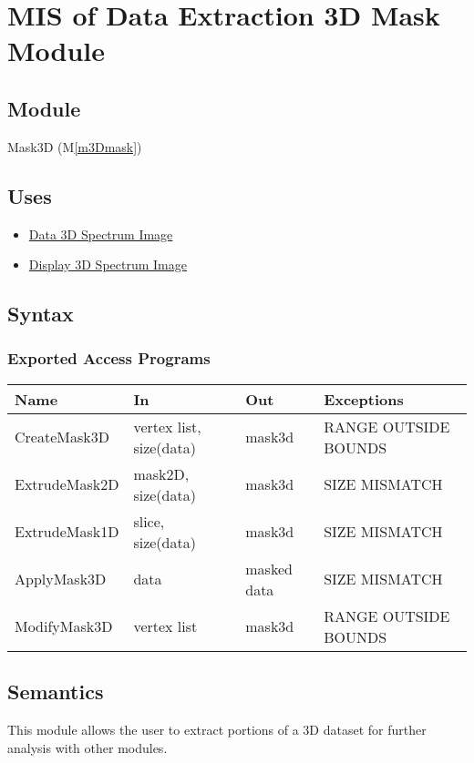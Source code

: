 \documentclass[12pt, titlepage]{article}
\newcommand{\mref}[1]{M\ref{#1}}
\begin{document}
\section{MIS of Data Extraction 3D Mask Module} \label{Mod:Mask3D}

\subsection{Module}

Mask3D (\mref{m3Dmask})

\subsection{Uses}
\begin{itemize}
    \item \hyperref[Mod:SI]{Data 3D Spectrum Image}
    \item \hyperref[Mod:Disp3D]{Display 3D Spectrum Image}
\end{itemize}

\subsection{Syntax}

\subsubsection{Exported Access Programs}

\begin{center}
    \begin{tabular}{p{3cm} p{4cm} p{4cm} p{4cm}}
        \hline
        \textbf{Name} & \textbf{In} & \textbf{Out} & \textbf{Exceptions} \\
        \hline
        CreateMask3D & vertex list, size(data) & mask3d & RANGE OUTSIDE BOUNDS \\
        ExtrudeMask2D & mask2D, size(data) & mask3d & SIZE MISMATCH \\
        ExtrudeMask1D & slice, size(data) & mask3d & SIZE MISMATCH \\
        ApplyMask3D & data & masked data & SIZE MISMATCH \\
        ModifyMask3D & vertex list & mask3d & RANGE OUTSIDE BOUNDS \\
        \hline
    \end{tabular}
\end{center}

\subsection{Semantics}
This module allows the user to extract portions of a 3D dataset for further
analysis with other modules.
\end{document}

